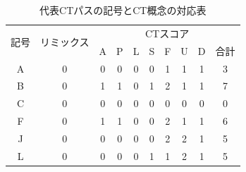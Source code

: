 \documentclass[submit,ses,noauthor]{ipsj}
\begin{document}
\begin{table}[h]
\begin{minipage}[t]{0.55\linewidth}
    \centering
    \caption{代表CTパスの記号とCT概念の対応表}
    \label{tab:dict-btod}
    \vspace{8mm}
      \begin{tabular}{c|c|cccccccc}
\hline
\multirow{2}{*}{記号} & \multicolumn{1}{l|}{\multirow{2}{*}{\small{リミックス}}} & \multicolumn{8}{c}{CTスコア}                                                                                                                                                         \\ \cline{3-10} 
                    & \multicolumn{1}{l|}{}                       & \multicolumn{1}{c|}{A} & \multicolumn{1}{c|}{P} & \multicolumn{1}{c|}{L} & \multicolumn{1}{c|}{S} & \multicolumn{1}{c|}{F} & \multicolumn{1}{c|}{U} & \multicolumn{1}{c|}{D} & 合計 \\ \hline \hline
A                   & 0                                           & \multicolumn{1}{c|}{0} & \multicolumn{1}{c|}{0} & \multicolumn{1}{c|}{0} & \multicolumn{1}{c|}{0} & \multicolumn{1}{c|}{1} & \multicolumn{1}{c|}{1} & \multicolumn{1}{c|}{1} & 3  \\ \hline
B                   & 0                                           & \multicolumn{1}{c|}{1} & \multicolumn{1}{c|}{1} & \multicolumn{1}{c|}{0} & \multicolumn{1}{c|}{1} & \multicolumn{1}{c|}{2} & \multicolumn{1}{c|}{1} & \multicolumn{1}{c|}{1} & 7  \\ \hline
C                   & 0                                           & \multicolumn{1}{c|}{0} & \multicolumn{1}{c|}{0} & \multicolumn{1}{c|}{0} & \multicolumn{1}{c|}{0} & \multicolumn{1}{c|}{0} & \multicolumn{1}{c|}{0} & \multicolumn{1}{c|}{0} & 0  \\ \hline
F                   & 0                                           & \multicolumn{1}{c|}{1} & \multicolumn{1}{c|}{1} & \multicolumn{1}{c|}{0} & \multicolumn{1}{c|}{0} & \multicolumn{1}{c|}{2} & \multicolumn{1}{c|}{1} & \multicolumn{1}{c|}{1} & 6  \\ \hline
J                   & 0                                           & \multicolumn{1}{c|}{0} & \multicolumn{1}{c|}{0} & \multicolumn{1}{c|}{0} & \multicolumn{1}{c|}{0} & \multicolumn{1}{c|}{2} & \multicolumn{1}{c|}{2} & \multicolumn{1}{c|}{1} & 5  \\ \hline
L                   & 0                                           & \multicolumn{1}{c|}{0} & \multicolumn{1}{c|}{0} & \multicolumn{1}{c|}{0} & \multicolumn{1}{c|}{1} & \multicolumn{1}{c|}{1} & \multicolumn{1}{c|}{2} & \multicolumn{1}{c|}{1} & 5  \\ \hline

\end{tabular}
\end{minipage}
\end{table}
\end{document}
